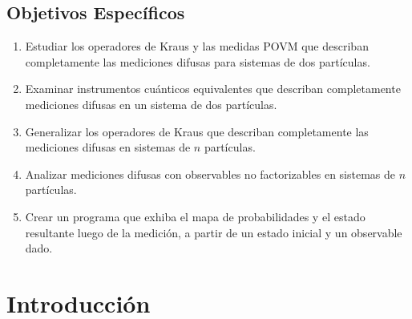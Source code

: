 \documentclass[12pt,oneside]{book}\raggedbottom{} %
\begin{document}
\begin{sloppypar}
{{%

\section*{Objetivos Específicos} %
\begin{enumerate}


\item Estudiar los operadores de Kraus  y las medidas POVM que describan completamente las mediciones difusas para sistemas de dos partículas.

\item 	Examinar instrumentos cuánticos equivalentes que describan completamente mediciones difusas en un sistema de dos partículas.



\item Generalizar los operadores de Kraus que describan completamente las mediciones difusas en sistemas de $n$ partículas.

\item Analizar mediciones difusas con observables no factorizables en sistemas de $n$ partículas.

\item Crear un programa que exhiba el mapa de probabilidades y el estado resultante luego de la medición, a partir de un estado inicial y un observable dado.
\end{enumerate}
\newpage

\chapter*{Introducción}  %

}}
\end{sloppypar}
\end{document}
